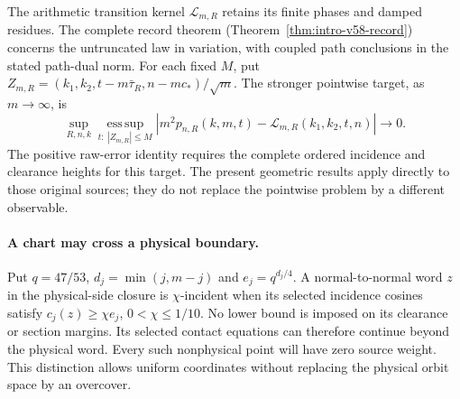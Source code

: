 \documentclass[11pt,reqno]{amsart}
\numberwithin{equation}{section}
\theoremstyle{definition}\newtheorem{definition}[theorem]{Definition}
\theoremstyle{remark}\newtheorem{remark}[theorem]{Remark}
\begin{document}
The arithmetic transition kernel $\mathcal L_{m,R}$ retains its finite
phases and damped residues. The complete record theorem
(Theorem~\ref{thm:intro-v58-record}) concerns the untruncated law in
variation, with coupled path conclusions in the stated path-dual norm.
For each fixed $M$, put
$Z_{m,R}=(k_1,k_2,t-m\bar\tau_R,n-mc_*)/\sqrt m$.
The stronger pointwise target, as $m\to\infty$, is
\[
 \sup_{R,n,k}\operatorname*{ess\,sup}_{t:\ |Z_{m,R}|\le M}
 \left|m^2p_{n,R}(k,m,t)-\mathcal L_{m,R}(k_1,k_2,t,n)\right|
 \longrightarrow0.
\]
The positive raw-error identity requires the complete ordered incidence
and clearance heights for this target. The present geometric results
apply directly to those original sources; they do not replace the
pointwise problem by a different observable.

\paragraph{A chart may cross a physical boundary.}
Put $q=47/53$, $d_j=\min(j,m-j)$ and $e_j=q^{d_j/4}$. A
normal-to-normal word $z$ in the physical-side closure is
$\chi$-incident when its selected incidence cosines satisfy
$c_j(z)\ge\chi e_j$, $0<\chi\le1/10$. No lower bound is imposed
on its clearance or section margins. Its selected contact equations
can therefore continue beyond the physical word. Every such nonphysical
point will have zero source weight. This distinction allows uniform
coordinates without replacing the physical orbit space by an overcover.
\end{document}
